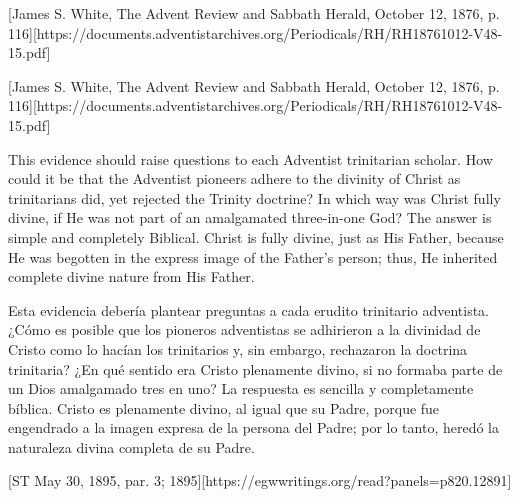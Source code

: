 [James S. White, The Advent Review and Sabbath Herald, October 12, 1876, p. 116][https://documents.adventistarchives.org/Periodicals/RH/RH18761012-V48-15.pdf]


[James S. White, The Advent Review and Sabbath Herald, October 12, 1876, p. 116][https://documents.adventistarchives.org/Periodicals/RH/RH18761012-V48-15.pdf]


This evidence should raise questions to each Adventist trinitarian scholar. How could it be that the Adventist pioneers adhere to the divinity of Christ as trinitarians did, yet rejected the Trinity doctrine? In which way was Christ fully divine, if He was not part of an amalgamated three-in-one God? The answer is simple and completely Biblical. Christ is fully divine, just as His Father, because He was begotten in the express image of the Father’s person; thus, He inherited complete divine nature from His Father.


Esta evidencia debería plantear preguntas a cada erudito trinitario adventista. ¿Cómo es posible que los pioneros adventistas se adhirieron a la divinidad de Cristo como lo hacían los trinitarios y, sin embargo, rechazaron la doctrina trinitaria? ¿En qué sentido era Cristo plenamente divino, si no formaba parte de un Dios amalgamado tres en uno? La respuesta es sencilla y completamente bíblica. Cristo es plenamente divino, al igual que su Padre, porque fue engendrado a la imagen expresa de la persona del Padre; por lo tanto, heredó la naturaleza divina completa de su Padre.


[ST May 30, 1895, par. 3; 1895][https://egwwritings.org/read?panels=p820.12891]


